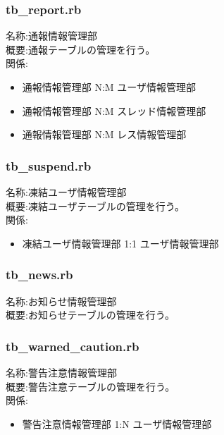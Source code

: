 \documentclass[a4j]{jarticle}
\begin{document}
\subsubsection{tb\_report.rb}
  \noindent
  名称:通報情報管理部\\
  概要:通報テーブルの管理を行う。\\
  関係:
  \begin{itemize}
  \item 通報情報管理部 N:M ユーザ情報管理部
  \item 通報情報管理部 N:M スレッド情報管理部
  \item 通報情報管理部 N:M レス情報管理部
  \end{itemize}



\subsubsection{tb\_suspend.rb}
  \noindent
  名称:凍結ユーザ情報管理部\\
  概要:凍結ユーザテーブルの管理を行う。\\
  関係:
  \begin{itemize}
  \item 凍結ユーザ情報管理部 1:1 ユーザ情報管理部
  \end{itemize}

\subsubsection{tb\_news.rb}
  \noindent
  名称:お知らせ情報管理部\\
  概要:お知らせテーブルの管理を行う。\\

\subsubsection{tb\_warned\_caution.rb}
  \noindent
  名称:警告注意情報管理部\\
  概要:警告注意テーブルの管理を行う。\\
  関係:
  \begin{itemize}
  \item 警告注意情報管理部 1:N ユーザ情報管理部
  \end{itemize}



\appendix
\end{document}
